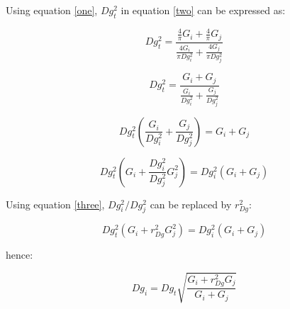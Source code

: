 \documentclass[a4paper]{article}
\begin{document}
\hfill

\noindent Using equation \ref{one}, $Dg_t^2$ in equation \ref{two} can be expressed as:

\begin{equation*}\label{}
  Dg_t^2 = \frac{\frac{4}{\pi}G_i + \frac{4}{\pi}G_j}{\frac{4G_i}{\pi Dg_i^2} + \frac{4G_j}{\pi Dg_j^2}}
\end{equation*}

\begin{equation*}\label{}
  Dg_t^2 = \frac{G_i + G_j} {\frac{G_i}{Dg_i^2} + \frac{G_j}{Dg_j^2}}
\end{equation*}

\begin{equation*}\label{}
  Dg_t^2(\frac{G_i}{Dg_i^2} + \frac{G_j}{Dg_j^2})= G_i + G_j
\end{equation*}

\begin{equation*}\label{}
  Dg_t^2(G_i + \frac{Dg_i^2}{Dg_j^2}G_j^2)= Dg_i^2(G_i + G_j)
\end{equation*}

\noindent Using equation \ref{three}, $Dg_i^2 / Dg_j^2$ can be replaced by $r_{Dg}^2$:

\begin{equation*}\label{}
  Dg_t^2(G_i + r_{Dg}^2G_j^2)= Dg_i^2(G_i + G_j)
\end{equation*}

\noindent hence:

\begin{equation*}\label{}
  Dg_i = Dg_t\sqrt{\frac{G_i + r_{Dg}^2G_j}{G_i + G_j}}
\end{equation*}
\end{document}
